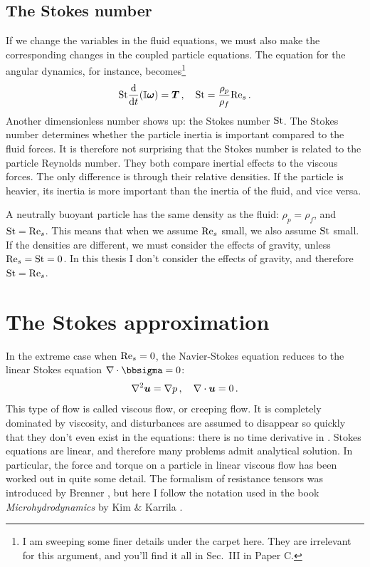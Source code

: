 \documentclass[thesis.tex]{subfiles}
\begin{document}
\subsection{The Stokes number}\label{sec:stokesnumber}
If we change the variables in the fluid equations, we must also make the corresponding changes in the coupled particle equations. The equation for the angular dynamics, for instance, becomes\footnote{I am sweeping some finer details under the carpet here. They are irrelevant for this argument, and you'll find it all in Sec.~III in Paper C.}
\begin{align}
	\mbox{St}\frac{\mathrm{d} }{\mathrm{d} t}(\mathbb{I} \mbox{\boldmath$\omega$}) = \mbox{\boldmath$T$}\,,\quad  \mbox{St}= \frac{\rho_p}{\rho_f}\textrm{Re}_s\,.
\end{align}
Another dimensionless number shows up: the Stokes number $\mbox{St}$. The Stokes number determines whether the particle inertia is important compared to the fluid forces. It is therefore not surprising that the Stokes number is related to the particle Reynolds number. They both compare inertial effects to the viscous forces. The only difference is through their relative densities. If the particle is heavier, its inertia is more important than the inertia of the fluid, and vice versa. 

A neutrally buoyant particle has the same density as the fluid: $\rho_p = \rho_f$, and $\mbox{St} = \textrm{Re}_s$. This means that when we assume $\textrm{Re}_s$ small, we also assume $\mbox{St}$ small. If the densities are different, we must consider the effects of gravity, unless $\textrm{Re}_s=\mbox{St}=0$. In this thesis I don't consider the effects of gravity, and therefore $\mbox{St} = \textrm{Re}_s$.

\section{The Stokes approximation}\label{sec:stokes}

In the extreme case when $\textrm{Re}_s=0$, the Navier-Stokes equation  reduces to the linear Stokes equation $\nabla \cdot \bbsigma = 0$:
\begin{align}
	\nabla^2 \ve u = \nabla p\,,\quad\nabla\cdot\ve u=0\,.\eqnlab{stokes}
\end{align}
This type of flow is called viscous flow, or creeping flow. It is completely dominated by viscosity, and disturbances are assumed to disappear so quickly that they don't even exist in the equations: there is no time derivative in . Stokes equations are linear, and therefore many problems admit analytical solution. In particular, the force and torque on a particle in linear viscous flow has been worked out in quite some detail. The formalism of resistance tensors was introduced by Brenner \cite{brenner1974, happel1965}, but here I follow the notation used in the book \emph{Microhydrodynamics} by Kim \& Karrila \cite{kim1991}.
\end{document}
